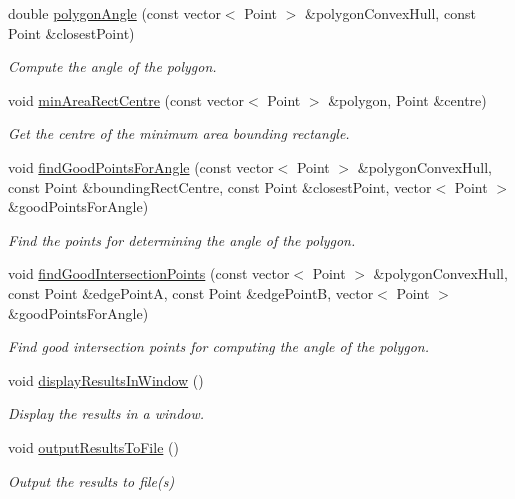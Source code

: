\begin{DoxyCompactItemize}
double \hyperlink{classmultiscale_1_1analysis_1_1Detector_a80dd82a52bdc63bee7f94d4c8403a785}{polygon\-Angle} (const vector$<$ \-Point $>$ \&polygon\-Convex\-Hull, const \-Point \&closest\-Point)
\begin{DoxyCompactList}\small\item\em \-Compute the angle of the polygon. \end{DoxyCompactList}\item 
void \hyperlink{classmultiscale_1_1analysis_1_1Detector_aeef6f9f7e29c79362df3469a0a5caafe}{min\-Area\-Rect\-Centre} (const vector$<$ \-Point $>$ \&polygon, \-Point \&centre)
\begin{DoxyCompactList}\small\item\em \-Get the centre of the minimum area bounding rectangle. \end{DoxyCompactList}\item 
void \hyperlink{classmultiscale_1_1analysis_1_1Detector_a9785ec165eb57a95243c5bcf679bc49b}{find\-Good\-Points\-For\-Angle} (const vector$<$ \-Point $>$ \&polygon\-Convex\-Hull, const \-Point \&bounding\-Rect\-Centre, const \-Point \&closest\-Point, vector$<$ \-Point $>$ \&good\-Points\-For\-Angle)
\begin{DoxyCompactList}\small\item\em \-Find the points for determining the angle of the polygon. \end{DoxyCompactList}\item 
void \hyperlink{classmultiscale_1_1analysis_1_1Detector_a2d8fe1a58bc6c792a45ffca988f2afe7}{find\-Good\-Intersection\-Points} (const vector$<$ \-Point $>$ \&polygon\-Convex\-Hull, const \-Point \&edge\-Point\-A, const \-Point \&edge\-Point\-B, vector$<$ \-Point $>$ \&good\-Points\-For\-Angle)
\begin{DoxyCompactList}\small\item\em \-Find good intersection points for computing the angle of the polygon. \end{DoxyCompactList}\item 
void \hyperlink{classmultiscale_1_1analysis_1_1Detector_abb6d85e1a13e96b748ea286a070bdf18}{display\-Results\-In\-Window} ()
\begin{DoxyCompactList}\small\item\em \-Display the results in a window. \end{DoxyCompactList}\item 
void \hyperlink{classmultiscale_1_1analysis_1_1Detector_a2eb7c5f8faefb9b8f09f94f88f804d80}{output\-Results\-To\-File} ()
\begin{DoxyCompactList}\small\item\em \-Output the results to file(s) \end{DoxyCompactList}\item 

\end{DoxyCompactItemize}
